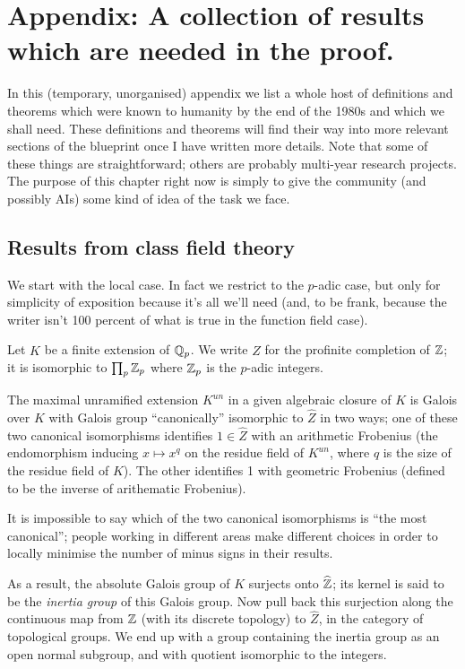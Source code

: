 \chapter{Appendix: A collection of results which are needed in the proof.}\label{ch_bestiary}

In this (temporary, unorganised) appendix we list a whole host of definitions and theorems which were known to humanity by the end of the 1980s and which we shall need. These definitions and theorems will find their way into more relevant sections of the blueprint once I have written more details. Note that some of these things are straightforward; others are probably multi-year research projects. The purpose of this chapter right now is simply to give the community (and possibly AIs) some kind of idea of the task we face.

\section{Results from class field theory}

We start with the local case. In fact we restrict to the $p$-adic case, but only for simplicity of exposition because it's all we'll need (and, to be frank, because the writer isn't 100 percent of what is true in the function field case).

Let $K$ be a finite extension of $\mathbb{Q}_p$. We write $\widehat{Z}$ for the profinite completion of $\mathbb{Z}$; it is isomorphic to $\prod_p\mathbb{Z}_p$ where $\mathbb{Z}_p$ is the $p$-adic integers.

\begin{theorem}\label{maximal_unramified_extension_of_p-adic_field} The maximal unramified extension $K^{un}$ in a given algebraic closure of $K$
    is Galois over $K$ with Galois group ``canonically'' isomorphic to $\widehat{Z}$ in two ways; one of these two canonical isomorphisms identifies $1\in\widehat{Z}$ with an arithmetic Frobenius (the endomorphism inducing $x\mapsto x^q$ on the residue field of $K^{un}$, where $q$ is the size of the residue field of $K$). The other identifies 1 with geometric Frobenius (defined to be the inverse of arithematic Frobenius).
\end{theorem}

It is impossible to say which of the two canonical isomorphisms is ``the most canonical''; people working in different areas make different choices in order to locally minimise the number of minus signs in their results.

As a result, the absolute Galois group of $K$ surjects onto $\widehat{\mathbb{Z}}$; its kernel is said to be the \emph{inertia group} of this Galois group. Now pull back this surjection along the continuous map from $\mathbb{Z}$ (with its discrete topology) to $\widehat{Z}$, in the category of topological groups. We end up with a group containing the inertia group as an open normal subgroup, and with quotient isomorphic to the integers.

